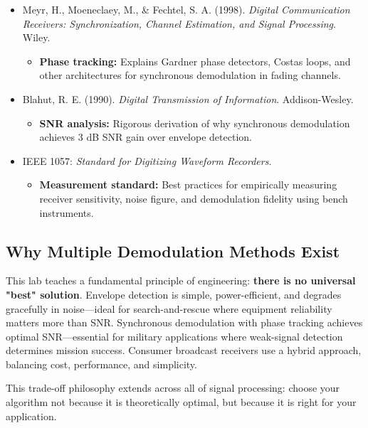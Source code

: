 \documentclass[11pt,letterpaper]{article}
\begin{document}
\begin{itemize}
    \item Meyr, H., Moeneclaey, M., \& Fechtel, S. A. (1998). \textit{Digital Communication Receivers: Synchronization, Channel Estimation, and Signal Processing}. Wiley.
    \begin{itemize}
        \item \textbf{Phase tracking:} Explains Gardner phase detectors, Costas loops, and other architectures for synchronous demodulation in fading channels.
    \end{itemize}

    \item Blahut, R. E. (1990). \textit{Digital Transmission of Information}. Addison-Wesley.
    \begin{itemize}
        \item \textbf{SNR analysis:} Rigorous derivation of why synchronous demodulation achieves $3$ dB SNR gain over envelope detection.
    \end{itemize}

    \item IEEE 1057: \textit{Standard for Digitizing Waveform Recorders}.
    \begin{itemize}
        \item \textbf{Measurement standard:} Best practices for empirically measuring receiver sensitivity, noise figure, and demodulation fidelity using bench instruments.
    \end{itemize}
\end{itemize}

\subsection*{Why Multiple Demodulation Methods Exist}

This lab teaches a fundamental principle of engineering: \textbf{there is no universal "best" solution}. Envelope detection is simple, power-efficient, and degrades gracefully in noise—ideal for search-and-rescue where equipment reliability matters more than SNR. Synchronous demodulation with phase tracking achieves optimal SNR—essential for military applications where weak-signal detection determines mission success. Consumer broadcast receivers use a hybrid approach, balancing cost, performance, and simplicity.

This trade-off philosophy extends across all of signal processing: choose your algorithm not because it is theoretically optimal, but because it is right for your application.
\end{document}
